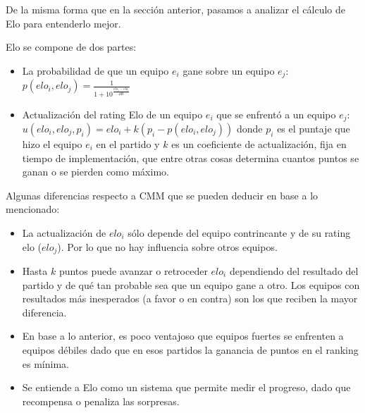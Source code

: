De la misma forma que en la sección anterior, pasamos a analizar el cálculo de Elo para entenderlo mejor.

Elo se compone de dos partes:

\begin{itemize}
    \item La probabilidad de que un equipo $e_i$ gane sobre un equipo $e_j$: $p(elo_i, elo_j) = \frac{1}{1 + 10^{\frac{elo_j - elo_i}{400}}}$
    \item Actualización del rating Elo de un equipo $e_i$ que se enfrentó a un equipo $e_j$: $u(elo_i, elo_j, p_i) = elo_i + k(p_i - p(elo_i, elo_j))$ donde $p_i$ es el puntaje que hizo el equipo $e_i$ en el partido y $k$ es un coeficiente de actualización, fija en tiempo de implementación, que entre otras cosas determina cuantos puntos se ganan o se pierden como máximo.
\end{itemize}

Algunas diferencias respecto a CMM que se pueden deducir en base a lo mencionado:

\begin{itemize}
    \item La actualización de $elo_i$ sólo depende del equipo contrincante y de su rating elo ($elo_j$). Por lo que no hay influencia sobre otros equipos.
    \item Hasta $k$ puntos puede avanzar o retroceder $elo_i$ dependiendo del resultado del partido y de qué tan probable sea que un equipo gane a otro. Los equipos con resultados más inesperados (a favor o en contra) son los que reciben la mayor diferencia.
    \item En base a lo anterior, es poco ventajoso que equipos fuertes se enfrenten a equipos débiles dado que en esos partidos la ganancia de puntos en el ranking es mínima.
    \item Se entiende a Elo como un sistema que permite medir el progreso, dado que recompensa o penaliza las sorpresas.
\end{itemize}
